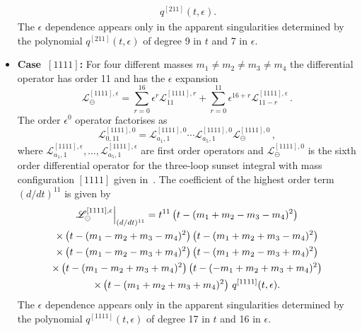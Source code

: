 \documentclass[a4paper,12pt]{article}
\numberwithin{equation}{section}
\numberwithin{figure}{section}
\def\su{\circleddash}
\begin{document}
\begin{itemize}
\begin{multline}
                   \, q^{[211]}(t,\epsilon).
                 \end{multline}
                 The $\epsilon$ dependence appears only in the
                 apparent singularities determined by the polynomial
                 $q^{[211]}(t,\epsilon)$ of degree 9 in $t$  and 7 in $\epsilon$.
  \item   {\bf Case~$[1111]$:} For four different masses $m_1\neq m_2\neq m_3 \neq m_4$ the
 differential operator has order 11 and has the $\epsilon$ expansion 
  \begin{equation}
    \mathscr{L}_\su^{[1111],\epsilon}=     \sum_{r=0}^{16}\epsilon^r
    \mathscr{L}^{[1111],r}_{11}+\sum_{r=0}^{11} \epsilon^{16+r}  \mathscr{L}^{[1111],\epsilon}_{11-r}\, .
  \end{equation}
    The order $\epsilon^0$ operator factorises as
  \begin{equation}
         \mathscr{L}^{[1111],0}_{0,11}=   \mathscr{L}^{[1111],0}_{a_1,1}  \cdots  \mathscr{L}^{[1111],0}_{a_5,1}   \mathscr{L}^{[1111],0}_{\su}\,,
       \end{equation}
        where  $ \mathscr{L}^{[1111],\epsilon}_{a_1,1},\dots,  \mathscr{L}^{[1111],\epsilon}_{a_5,1}$ are  first order operators
       and $\mathscr{L}^{[1111],0}_{\su}$ is the sixth  order differential operator for the
       three-loop sunset integral with mass configuration $[1111]$
       given in~\cite{Lairez:2022zkj}.
        The coefficient of the highest order term $(d/dt)^{11}$    is given by
       \begin{multline}
                   \mathscr{L}^{[1111],\epsilon}_\su\Big\vert_{(d/dt)^{11}}=
                   t^{11}\left(t-(m_{1}+m_{2}-m_{3}-m_{4})^2\right) \cr\times
   \left(t-(m_{1}-m_{2}+m_{3}-m_{4})^2\right)
   \left(t-(m_{1}+m_{2}+m_{3}-m_{4})^2\right) \cr\times
   \left(t-(m_{1}-m_{2}-m_{3}+m_{4})^2\right)
   \left(t-(m_{1}+m_{2}-m_{3}+m_{4})^2\right)\cr\times
   \left(t-(m_{1}-m_{2}+m_{3}+m_{4})^2\right)
   \left(t-(-m_{1}+m_{2}+m_{3}+m_{4})^2\right) \cr\times
   \left(t-(m_{1}+m_{2}+m_{3}+m_{4})^2\right)
                   \, q^{[1111]}(t,\epsilon).
                 \end{multline}
                 The $\epsilon$ dependence appears only in the
                 apparent singularities determined by the polynomial
                 $q^{[1111]}(t,\epsilon)$ of degree 17 in
                 $t$ and 16 in $\epsilon$.
     \end{itemize}
\end{document}
